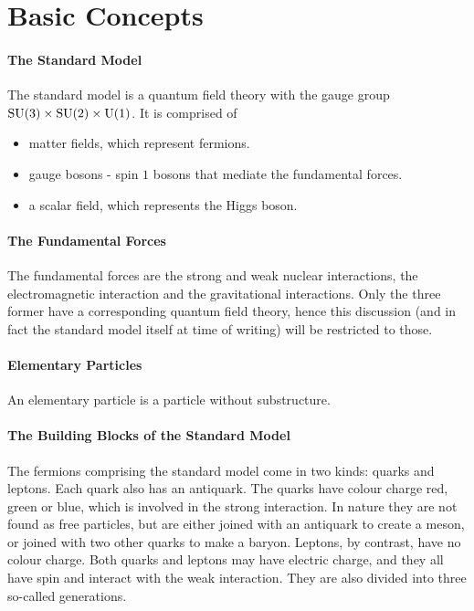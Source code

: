 \section{Basic Concepts}

\paragraph{The Standard Model}
The standard model is a quantum field theory with the gauge group $\text{SU}(3)\times\text{SU}(2)\times\text{U}(1)$. It is comprised of
\begin{itemize}
	\item matter fields, which represent fermions.
	\item gauge bosons - spin $1$ bosons that mediate the fundamental forces.
	\item a scalar field, which represents the Higgs boson.
\end{itemize}

\paragraph{The Fundamental Forces}
The fundamental forces are the strong and weak nuclear interactions, the electromagnetic interaction and the gravitational interactions. Only the three former have a corresponding quantum field theory, hence this discussion (and in fact the standard model itself at time of writing) will be restricted to those.

\paragraph{Elementary Particles}
An elementary particle is a particle without substructure.

\paragraph{The Building Blocks of the Standard Model}
The fermions comprising the standard model come in two kinds: quarks and leptons. Each quark also has an antiquark. The quarks have colour charge red, green or blue, which is involved in the strong interaction. In nature they are not found as free particles, but are either joined with an antiquark to create a meson, or joined with two other quarks to make a baryon. Leptons, by contrast, have no colour charge. Both quarks and leptons may have electric charge, and they all have spin and interact with the weak interaction. They are also divided into three so-called generations.

